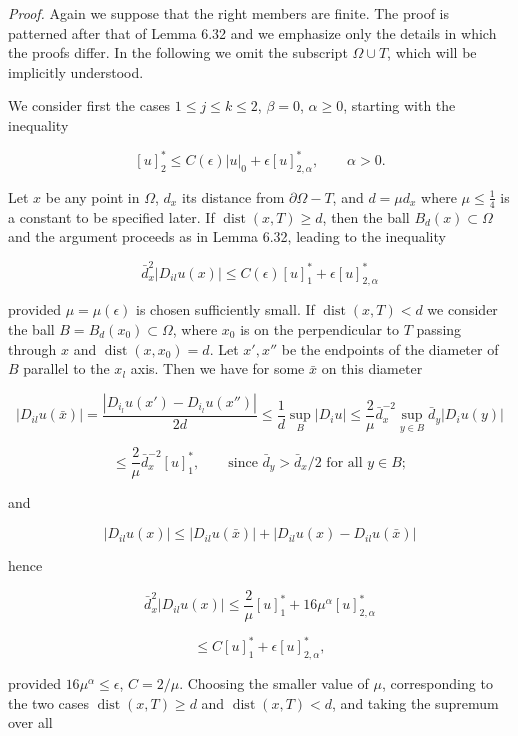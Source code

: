 \noindent \textit{Proof.} Again we suppose that the right members are finite. The proof is patterned
after that of Lemma 6.32 and we emphasize only the details in which the proofs
differ. In the following we omit the subscript $\Omega\cup T$, which will be implicitly
understood.

\par We consider first the cases $1\leq j\leq k\leq 2$, $\beta=0$, $\alpha\geq 0$, starting with the inequality

\begin{equation}
\tag{6.90}
[u]^*_{2}\leq C(\epsilon)|u|_{0}+\epsilon [u]^*_{2,\alpha}, \qquad \alpha>0.
\end{equation}

\par Let $x$ be any point in $\Omega$, $d_x$ its distance from $\partial\Omega - T$, and $d=\mu d_x$ where $\mu\leq \frac14$
is a constant to be specified later. If $\operatorname{dist}(x,T)\geq d$, then the ball $B_d(x)\subset\Omega$ and the
argument proceeds as in Lemma 6.32, leading to the inequality

\[
\bar d_x^2|D_{il}u(x)|\leq C(\epsilon)[u]^*_1+\epsilon [u]^*_{2,\alpha}
\]

\noindent provided $\mu=\mu(\epsilon)$ is chosen sufficiently small. If $\operatorname{dist}(x,T)<d$ we consider the ball
$B=B_d(x_0)\subset\Omega$, where $x_0$ is on the perpendicular to $T$ passing through $x$ and
$\operatorname{dist}(x,x_0)=d$. Let $x',x''$ be the endpoints of the diameter of $B$ parallel to the $x_l$
axis. Then we have for some $\bar x$ on this diameter

\[
|D_{il}u(\bar x)|=\frac{|D_{i_l}u(x')-D_{i_l}u(x'')|}{2d}\leq \frac{1}{d}\sup_B |D_i u|
\leq \frac{2}{\mu}\bar d_x^{-2}\sup_{y\in B}\bar d_y |D_i u(y)|
\]

\[
\leq \frac{2}{\mu}\bar d_x^{-2}[u]^*_1, \qquad \text{since }\bar d_y>\bar d_x/2\text{ for all }y\in B;
\]

\noindent and

\[
|D_{il}u(x)|\leq |D_{il}u(\bar x)|+|D_{il}u(x)-D_{il}u(\bar x)|
\]


\noindent hence

\[
\bar d_x^2|D_{il}u(x)|\leq \frac{2}{\mu}[u]^*_1+16\mu^\alpha [u]^*_{2,\alpha}
\]

\[
\leq C[u]^*_1+\epsilon [u]^*_{2,\alpha},
\]

\noindent provided $16\mu^\alpha\leq \epsilon$, $C=2/\mu$. Choosing the smaller value of $\mu$, corresponding to the
two cases $\operatorname{dist}(x,T)\geq d$ and $\operatorname{dist}(x,T)<d$, and taking the supremum over all


